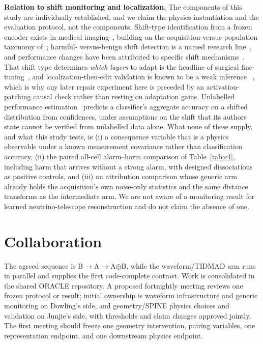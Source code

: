 \documentclass[10pt,twocolumn]{extarticle}
\begin{document}
\textbf{Relation to shift monitoring and localization.} The components of this
study are individually established, and we claim the physics instantiation and
the evaluation protocol, not the components. Shift-type identification from a
frozen encoder exists in medical imaging~\cite{roschewitz2024}, building on
the acquisition-versus-population taxonomy of~\cite{castro2020}; harmful-%
versus-benign shift detection is a named research line~\cite{podkopaev2022,
rabanser2019}, and performance changes have been attributed to specific shift
mechanisms~\cite{zhang2023}. That shift type determines \emph{which layers} to
adapt is the headline of surgical fine-tuning~\cite{lee2023surgical}, and
localization-then-edit validation is known to be a weak inference~%
\cite{hase2023}, which is why any later repair experiment here is preceded by
an activation-patching causal check rather than resting on adaptation gains.
Unlabelled performance estimation~\cite{guillory2021,garg2022} predicts a
classifier's aggregate accuracy on a shifted distribution from confidences,
under assumptions on the shift that its authors state cannot be verified from
unlabelled data alone. What none of these supply, and what this study tests,
is (i) a consequence variable that is a physics observable under a known
measurement covariance rather than classification accuracy, (ii) the paired
all-cell alarm--harm comparison of Table~\ref{tab:c4}, including harm that
arrives without a strong alarm, with designed dissociations as positive
controls, and (iii) an attribution comparison whose generic arm already
holds the acquisition's own noise-only statistics and the same distance
transforms as the intermediate arm. We are not
aware of a monitoring result for learned neutrino-telescope reconstruction and
do not claim the absence of one.

\section{Collaboration}

The agreed sequence is B$\rightarrow$A$\rightarrow$A$\oplus$B, while the
waveform/TIDMAD arm runs in parallel and supplies the first code-complete
contrast. Work is consolidated in the shared ORACLE repository. A proposed
fortnightly meeting reviews one frozen
protocol or result; initial ownership is waveform infrastructure and generic
monitoring on Dowling's side, and geometry/SPINE physics choices and validation
on Junjie's side, with thresholds and claim changes approved jointly. The first
meeting should freeze one geometry intervention, pairing variables, one
representation endpoint, and one downstream physics endpoint.
\end{document}
